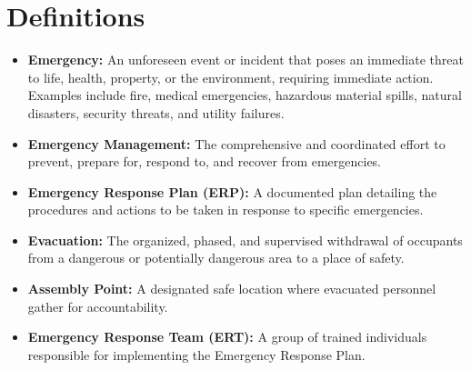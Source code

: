 \documentclass[12pt]{article}
\begin{document}
\section{Definitions}
\begin{itemize}
    \item \textbf{Emergency:} An unforeseen event or incident that poses an immediate threat to life, health, property, or the environment, requiring immediate action. Examples include fire, medical emergencies, hazardous material spills, natural disasters, security threats, and utility failures.
    \item \textbf{Emergency Management:} The comprehensive and coordinated effort to prevent, prepare for, respond to, and recover from emergencies.
    \item \textbf{Emergency Response Plan (ERP):} A documented plan detailing the procedures and actions to be taken in response to specific emergencies.
    \item \textbf{Evacuation:} The organized, phased, and supervised withdrawal of occupants from a dangerous or potentially dangerous area to a place of safety.
    \item \textbf{Assembly Point:} A designated safe location where evacuated personnel gather for accountability.
    \item \textbf{Emergency Response Team (ERT):} A group of trained individuals responsible for implementing the Emergency Response Plan.
\end{itemize}
\end{document}
